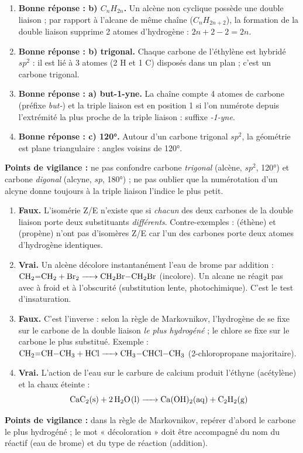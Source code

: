 \documentclass[11pt]{article}
\newcommand{\cle}[1]{{\popxbold\color{popdark}#1}}
\begin{document}
\begin{corrige}
\begin{enumerate}
\item \textbf{Bonne réponse : b) $C_nH_{2n}$.} Un alcène non cyclique possède une double liaison  ; par rapport à l'alcane de même chaîne ($C_nH_{2n+2}$), la formation de la double liaison supprime 2 atomes d'hydrogène : $2n+2-2 = 2n$.
\item \textbf{Bonne réponse : b) trigonal.} Chaque carbone de l'éthylène est hybridé $sp^2$ : il est lié à 3 atomes (2 H et 1 C) disposés dans un plan ; c'est un \cle{carbone trigonal}.
\item \textbf{Bonne réponse : a) but-1-yne.} La chaîne compte 4 atomes de carbone (préfixe \emph{but-}) et la triple liaison est en position 1 si l'on numérote depuis l'extrémité la plus proche de la triple liaison : suffixe \emph{-1-yne}.
\item \textbf{Bonne réponse : c) \ang{120}.} Autour d'un carbone trigonal $sp^2$, la géométrie est plane triangulaire : angles voisins de \ang{120}.
\end{enumerate}
\textbf{Points de vigilance :} ne pas confondre carbone \emph{trigonal} (alcène, $sp^2$, \ang{120}) et carbone \emph{digonal} (alcyne, $sp$, \ang{180}) ; ne pas oublier que la numérotation d'un alcyne donne toujours à la triple liaison l'indice le plus petit.
\end{corrige}

\begin{corrige}
\begin{enumerate}
\item \textbf{Faux.} L'isomérie Z/E n'existe que si \emph{chacun} des deux carbones de la double liaison porte deux substituants \emph{différents}. Contre-exemples :  (éthène) et  (propène) n'ont pas d'isomères Z/E car l'un des carbones porte deux atomes d'hydrogène identiques.
\item \textbf{Vrai.} Un alcène décolore instantanément l'eau de brome par addition : $\ce{CH2=CH2 + Br2 -> CH2Br-CH2Br}$ (incolore). Un alcane ne réagit pas avec  à froid et à l'obscurité (substitution lente, photochimique). C'est le \cle{test d'insaturation}.
\item \textbf{Faux.} C'est l'inverse : selon la règle de Markovnikov, l'hydrogène de  se fixe sur le carbone de la double liaison \emph{le plus hydrogéné} ; le chlore se fixe sur le carbone le plus substitué. Exemple : $\ce{CH2=CH-CH3 + HCl -> CH3-CHCl-CH3}$ (2-chloropropane majoritaire).
\item \textbf{Vrai.} L'action de l'eau sur le carbure de calcium produit l'éthyne (acétylène) et la chaux éteinte : \[ \ce{CaC2(s) + 2 H2O(l) -> Ca(OH)2(aq) + C2H2(g)} \]
\end{enumerate}
\textbf{Points de vigilance :} dans la règle de Markovnikov, repérer d'abord le carbone le plus hydrogéné ; le mot « décoloration » doit être accompagné du nom du réactif (eau de brome) et du type de réaction (addition).
\end{corrige}
\end{document}
